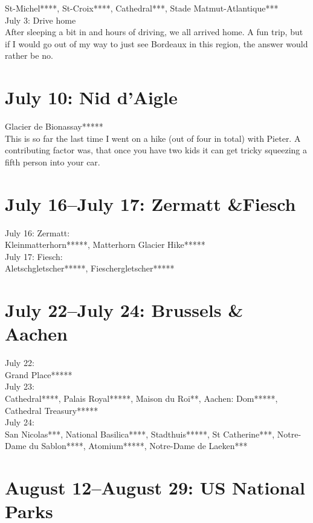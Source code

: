 St-Michel****, St-Croix****, Cathedral***, Stade Matmut-Atlantique***\\

July 3: Drive home\\
After sleeping a bit in and hours of driving, we all arrived home. A fun trip, but if I would go out of my way to just see Bordeaux in this region, the answer would rather be no.

\section{July 10: Nid d'Aigle}
\label{Niddaigle2016}

Glacier de Bionassay*****\\

This is so far the last time I went on a hike (out of four in total) with Pieter. A contributing factor was, that once you have two kids it can get tricky squeezing a fifth person into your car.\\

\section{July 16--July 17: Zermatt \&Fiesch}
\label{ZermattFiesch2016}

July 16: Zermatt:\\
Kleinmatterhorn*****, Matterhorn Glacier Hike*****\\

July 17: Fiesch:\\
Aletschgletscher*****, Fieschergletscher*****

\section{July 22--July 24: Brussels \& Aachen}
\label{Brussels2016}

July 22:\\
Grand Place*****\\

July 23:\\
Cathedral****, Palais Royal*****, Maison du Roi**,  Aachen: Dom*****, Cathedral Treasury*****\\

July 24:\\
San Nicolas***, National Basilica****, Stadthuis*****, St Catherine***, Notre-Dame du Sablon****,  Atomium*****, Notre-Dame de Laeken***

\section{August 12--August 29: US National Parks}
\label{US2016}

